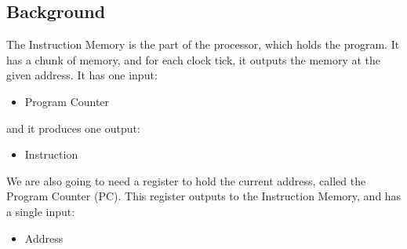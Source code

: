 \documentclass{beamer}
\begin{document}
\subsection{Background}
\begin{frame}
    The Instruction Memory is the part of the processor, which holds the
    program. It has a chunk of memory, and for each clock tick, it outputs the
    memory at the given address. It has one input:
    \begin{itemize}
        \item Program Counter
    \end{itemize}
    and it produces one output:
    \begin{itemize}
        \item Instruction
    \end{itemize}

    \vspace{\baselineskip}
    We are also going to need a register to hold the current address, called
    the Program Counter (PC). This register outputs to the Instruction Memory,
    and has a single input:
    \begin{itemize}
        \item Address
    \end{itemize}
\end{frame}
\begin{frame}
    \begin{figure}
    \end{figure}
\end{frame}
\end{document}
